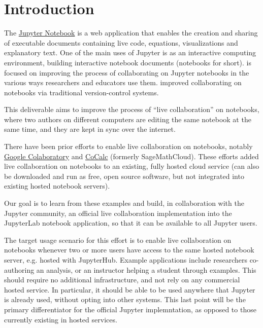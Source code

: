 \documentclass{deliverablereport}
\author{Benjamin Ragan-Kelley, Vidar Tonaas Fauske}
\begin{document}
\maketitle
\tableofcontents


\section{Introduction}

The \href{https://jupyter.org}{Jupyter Notebook} is a web application
that enables the creation and sharing of executable documents
containing live code, equations, visualizations and explanatory text.
One of the main uses of Jupyter is as an interactive computing environment,
building interactive notebook documents (notebooks for short).
 is focused on improving the process of collaborating
on Jupyter notebooks in the various ways researchers and educators use them.
 improved collaborating on notebooks via traditional version-control systems.

This deliverable aims to improve the process of ``live collaboration'' on notebooks,
where two authors on different computers are editing the same notebook at the same time,
and they are kept in sync over the internet.

There have been prior efforts to enable live collaboration on notebooks,
notably \href{https://colaboratory.google.com}{Google Colaboratory}
and \href{https://cocalc.com}{CoCalc} (formerly SageMathCloud).
These efforts added live collaboration on notebooks to an existing,
fully hosted cloud service (\cocalc can also be downloaded and run as
free, open source software, but not integrated into existing
hosted notebook servers).

Our goal is to learn from these examples and build,
in collaboration with the Jupyter community,
an official live collaboration implementation into the JupyterLab notebook application,
so that it can be available to all Jupyter users.


The target usage scenario for this effort is to enable live
collaboration on notebooks whenever two or more users have access to the same hosted notebook server, e.g. hosted with JupyterHub.
Example applications include researchers co-authoring an analysis,
or an instructor helping a student through examples.
This should require no additional infrastructure,
and not rely on any commercial hosted service.
In particular, it should be able to be used anywhere that Jupyter is already used,
without opting into other systems.
This last point will be the primary differentiator for the official Jupyter implemntation,
as opposed to those currently existing in hosted services.
\end{document}

